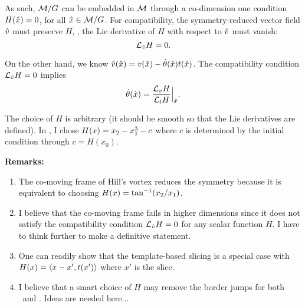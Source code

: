 \begin{description}
{As such, ${\cal M}/G$ can be embedded in ${\cal M}$ through a co-dimension one
condition $H(\hat{x})=0$, for all $\hat{x}\in {\cal M}/G$. For
compatibility, the symmetry-reduced vector field $\hat{v}$ must preserve $H$,
\ie, the Lie derivative of $H$ with respect to $\hat{v}$ must vanish:
\begin{equation}
\mathcal L_{\hat{v}} H =0.
\label{eq:symRed_conserv}
\end{equation}

On the other hand, we know
$\hat{v}(\hat{x})=v(\hat{x})-\dot\theta(\hat{x}) t(\hat{x})$.
The compatibility condition $\mathcal L_{\hat{v}} H =0$ implies
\begin{equation}
\dot\theta(\hat{x})=\frac{\mathcal L_vH}{\mathcal L_t H}\Big|_{\hat{x}}.
\label{eq:compatibility}
\end{equation}


The choice of $H$ is arbitrary (it should be smooth so that the
Lie derivatives are defined).
In , I chose
$H(x)=x_2-x_1^3-c$ where $c$ is determined by the initial condition
through $c=H(x_0)$.

{\bf Remarks:}
\begin{enumerate}
	\item The co-moving frame of Hill's vortex reduces the symmetry because it is equivalent
	to choosing $H(x)=\tan^{-1}(x_2/x_1)$.
	
	\item I believe that the co-moving frame fails in higher dimensions
        since it does not satisfy the compatibility condition $\mathcal
        L_{\hat{v}} H =0$ for any scalar function $H$. I have to think
        further to make a definitive statement.
	
	\item One can readily show that the template-based slicing is a
          special case with $H(x)=\langle x-x',t(x')\rangle$ where $x'$
            is the slice.

	
	\item I believe that a smart choice of $H$ may remove the border
        jumps for both  \twomode\ and \cLe.
        Ideas are needed here...
\end{enumerate}
}


\end{description}
